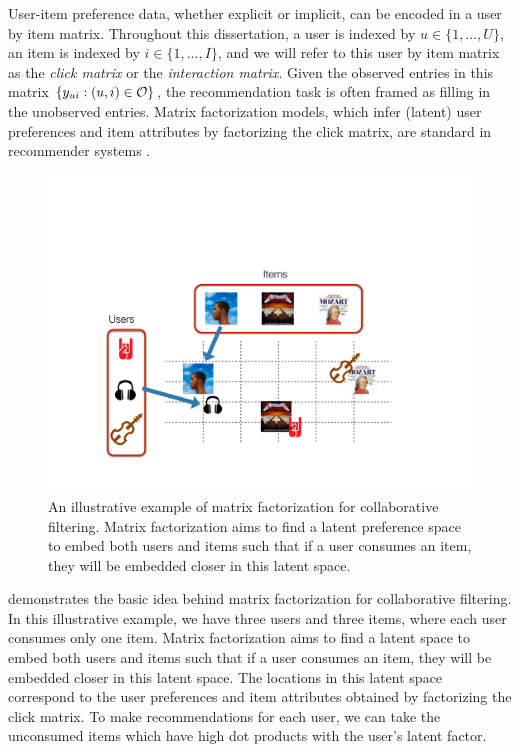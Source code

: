 User-item preference data, whether explicit or implicit, can be encoded in a user by item matrix. Throughout this dissertation, a user is indexed by $u \in \{1, \dots, U\}$, an item is indexed by $i \in \{1, \dots, I\}$, and we will refer to this user by item matrix as the \emph{click matrix} or the \emph{interaction matrix}. Given the observed entries in this matrix $\{y_{ui}: (u, i) \in \mathcal{O}\}$, the recommendation task is often framed as filling in the unobserved entries.  Matrix factorization models, which infer (latent) user preferences and item attributes by factorizing the click matrix, are standard in recommender systems \citep{koren2009matrix}. 

\begin{figure}
  \centering
    \includegraphics[width=\textwidth]{fig/cf_cartoon}
      \caption{An illustrative example of matrix factorization for collaborative filtering. Matrix factorization aims to find a latent preference space to embed both users and items such that if a user consumes an item, they will be embedded closer in this latent space.}
      \label{chpt:background:fig:cf_cartoon}
\end{figure}

 demonstrates the basic idea behind matrix factorization for collaborative filtering. In this illustrative example, we have three users and three items, where each user consumes only one item. Matrix factorization aims to find a latent space to embed both users and items such that if a user consumes an item, they will be embedded closer in this latent space. The locations in this latent space correspond to the user preferences and item attributes obtained by factorizing the click matrix. To make recommendations for each user, we can take the unconsumed items which have high dot products with the user's latent factor. 

